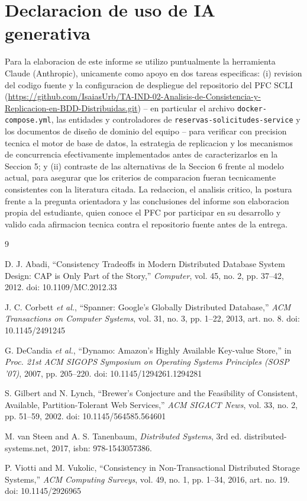 \documentclass[11pt,a4paper]{article}
\newcommand{\repoPFC}{\url{https://github.com/IsaiasUrb/TA-IND-02-Analisis-de-Consistencia-y-Replicacion-en-BDD-Distribuidas.git}}
\begin{document}
\section{Declaracion de uso de IA generativa}

Para la elaboracion de este informe se utilizo puntualmente la herramienta Claude (Anthropic), unicamente como apoyo en dos tareas especificas: (i) revision del codigo fuente y la configuracion de despliegue del repositorio del PFC SCLI (\repoPFC) -- en particular el archivo \texttt{docker-compose.yml}, las entidades y controladores de \texttt{reservas-solicitudes-service} y los documentos de diseño de dominio del equipo -- para verificar con precision tecnica el motor de base de datos, la estrategia de replicacion y los mecanismos de concurrencia efectivamente implementados antes de caracterizarlos en la Seccion 5; y (ii) contraste de las alternativas de la Seccion 6 frente al modelo actual, para asegurar que los criterios de comparacion fueran tecnicamente consistentes con la literatura citada. La redaccion, el analisis critico, la postura frente a la pregunta orientadora y las conclusiones del informe son elaboracion propia del estudiante, quien conoce el PFC por participar en su desarrollo y valido cada afirmacion tecnica contra el repositorio fuente antes de la entrega.

\newpage
\begin{thebibliography}{9}

D. J. Abadi, ``Consistency Tradeoffs in Modern Distributed Database System Design: CAP is Only Part of the Story,'' \emph{Computer}, vol. 45, no. 2, pp. 37--42, 2012. doi: 10.1109/MC.2012.33

J. C. Corbett \emph{et al.}, ``Spanner: Google's Globally Distributed Database,'' \emph{ACM Transactions on Computer Systems}, vol. 31, no. 3, pp. 1--22, 2013, art. no. 8. doi: 10.1145/2491245

G. DeCandia \emph{et al.}, ``Dynamo: Amazon's Highly Available Key-value Store,'' in \emph{Proc. 21st ACM SIGOPS Symposium on Operating Systems Principles (SOSP '07)}, 2007, pp. 205--220. doi: 10.1145/1294261.1294281

S. Gilbert and N. Lynch, ``Brewer's Conjecture and the Feasibility of Consistent, Available, Partition-Tolerant Web Services,'' \emph{ACM SIGACT News}, vol. 33, no. 2, pp. 51--59, 2002. doi: 10.1145/564585.564601

M. van Steen and A. S. Tanenbaum, \emph{Distributed Systems}, 3rd ed. distributed-systems.net, 2017, isbn: 978-1543057386.

P. Viotti and M. Vukolic, ``Consistency in Non-Transactional Distributed Storage Systems,'' \emph{ACM Computing Surveys}, vol. 49, no. 1, pp. 1--34, 2016, art. no. 19. doi: 10.1145/2926965

\end{thebibliography}
\end{document}
